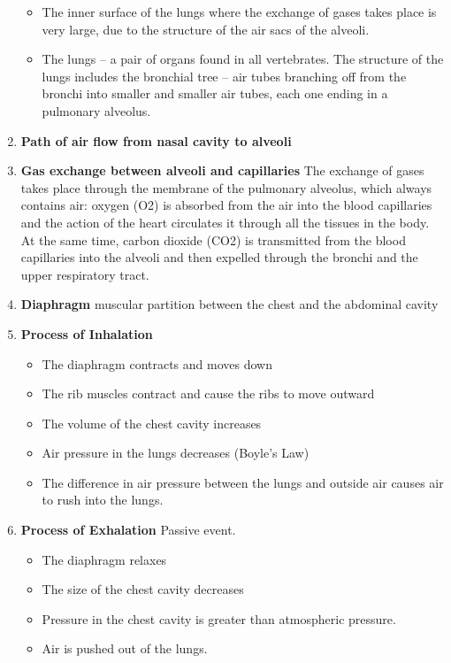 \documentclass[9pt]{article}
\begin{document}
\begin{enumerate}
\begin{itemize}
  \item The inner surface of the lungs where the exchange of gases takes place is very large, due to the structure of the air sacs of the alveoli.

  \item The lungs – a pair of organs found in all vertebrates. 
The structure of the lungs includes the bronchial tree – air tubes branching off from the bronchi into smaller and smaller air tubes, each one ending in a pulmonary alveolus.
  \end{itemize}

  \item {\bf Path of air flow from nasal cavity to alveoli}
  \item {\bf Gas exchange between alveoli and capillaries} The exchange of gases takes place through the membrane of the pulmonary alveolus, which always contains air: oxygen (O2) is absorbed from the air into the blood capillaries and the action of the heart circulates it through all the tissues in the body. At the same time, carbon dioxide (CO2) is transmitted from the blood capillaries into the alveoli and then expelled through the bronchi and the upper respiratory tract.
  \item {\bf Diaphragm} muscular partition between the chest and the abdominal cavity
  \item {\bf Process of Inhalation}
    \begin{itemize}
      \item The diaphragm contracts and moves down
      \item The rib muscles contract and cause the ribs to move outward
      \item The volume of the chest cavity increases
      \item Air pressure in the lungs decreases (Boyle’s Law)
      \item The difference in air pressure between the lungs and
        outside air causes air to rush into the lungs.
    \end{itemize}
  \item {\bf Process of Exhalation} Passive event.
    \begin{itemize}
    \item The diaphragm relaxes
    \item The size of the chest cavity decreases
    \item Pressure in the chest cavity is greater than atmospheric
      pressure.
    \item Air is pushed out of the lungs.

\end{itemize}
\end{enumerate}
\end{document}
